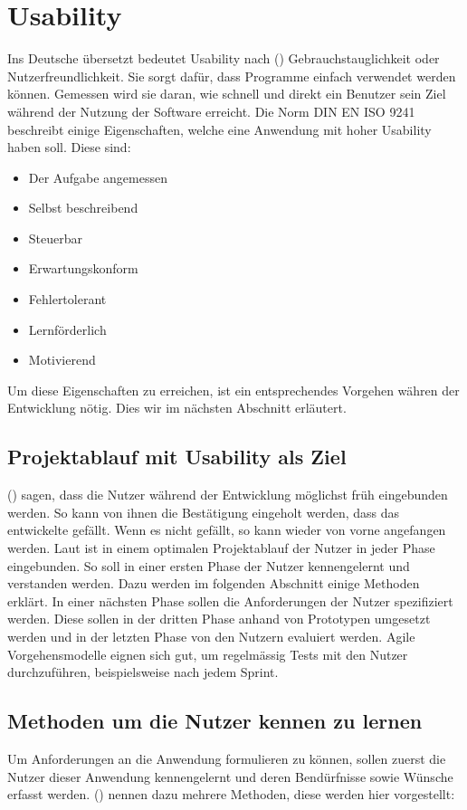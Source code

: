 \section{Usability}
Ins Deutsche übersetzt bedeutet Usability nach \citeauthor{usability} (\citeyear{usability}) Gebrauchstauglichkeit oder Nutzerfreundlichkeit.
Sie sorgt dafür, dass Programme einfach verwendet werden können.
Gemessen wird sie daran, wie schnell und direkt ein Benutzer sein Ziel während der Nutzung der Software erreicht.
Die Norm DIN EN ISO 9241 beschreibt einige Eigenschaften, welche eine Anwendung mit hoher Usability haben soll.
Diese sind:
\begin{itemize}
   \item Der Aufgabe angemessen
   \item Selbst beschreibend
   \item Steuerbar
   \item Erwartungskonform
   \item Fehlertolerant
   \item Lernförderlich
   \item Motivierend
\end{itemize}
Um diese Eigenschaften zu erreichen, ist ein entsprechendes Vorgehen währen der Entwicklung nötig.
Dies wir im nächsten Abschnitt erläutert.


\subsection{Projektablauf mit Usability als Ziel}
\citeauthor{usability} (\citeyear{usability}) sagen, dass die Nutzer während der Entwicklung möglichst früh eingebunden werden.
So kann von ihnen die Bestätigung eingeholt werden, dass das entwickelte gefällt.
Wenn es nicht gefällt, so kann wieder von vorne angefangen werden.
Laut \citeauthor{usability} ist in einem optimalen Projektablauf der Nutzer in jeder Phase eingebunden.
So soll in einer ersten Phase der Nutzer kennengelernt und verstanden werden.
Dazu werden im folgenden Abschnitt einige Methoden erklärt.
In einer nächsten Phase sollen die Anforderungen der Nutzer spezifiziert werden.
Diese sollen in der dritten Phase anhand von Prototypen umgesetzt werden und in der letzten Phase von den Nutzern evaluiert werden.
Agile Vorgehensmodelle eignen sich gut, um regelmässig Tests mit den Nutzer durchzuführen, beispielsweise nach jedem Sprint.


\subsection{Methoden um die Nutzer kennen zu lernen}
Um Anforderungen an die Anwendung formulieren zu können, sollen zuerst die Nutzer dieser Anwendung kennengelernt und deren Bendürfnisse sowie Wünsche erfasst werden.
\citeauthor{usability} (\citeyear{usability}) nennen dazu mehrere Methoden, diese werden hier vorgestellt:

